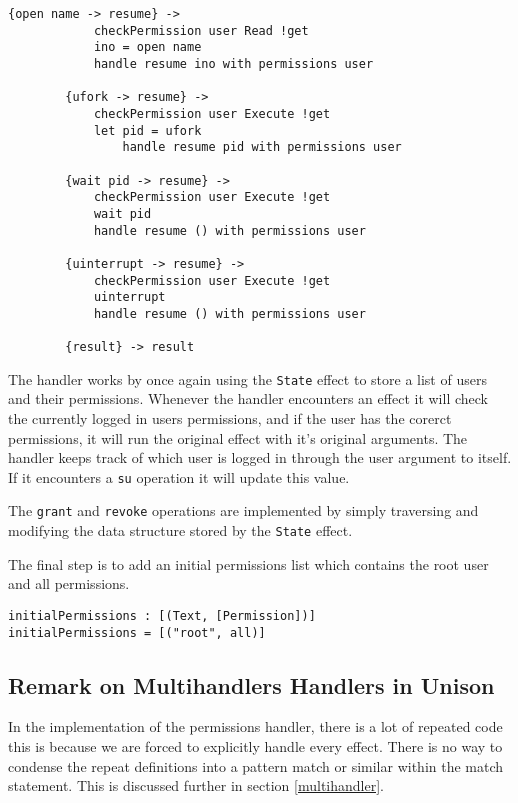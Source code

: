 \documentclass[logo,bsc,singlespacing,parskip]{infthesis}
\begin{document}
\begin{lstlisting}[language=unison]
        {open name -> resume} ->
            checkPermission user Read !get
            ino = open name
            handle resume ino with permissions user

        {ufork -> resume} ->
            checkPermission user Execute !get
            let pid = ufork
                handle resume pid with permissions user

        {wait pid -> resume} ->
            checkPermission user Execute !get
            wait pid
            handle resume () with permissions user

        {uinterrupt -> resume} ->
            checkPermission user Execute !get
            uinterrupt
            handle resume () with permissions user

        {result} -> result
\end{lstlisting}

The handler works by once again using the \texttt{State} effect to store a list
of users and their permissions. Whenever the handler encounters an effect it
will check the currently logged in users permissions, and if the user has the
corerct permissions, it will run the original effect with it's original
arguments. The handler keeps track of which user is logged in through the user
argument to itself. If it encounters a \texttt{su} operation it will update
this value.

The \texttt{grant} and \texttt{revoke} operations are implemented by simply 
traversing and modifying the data structure stored by the \texttt{State} effect.

The final step is to add an initial permissions list which contains the root
user and all permissions.

\begin{lstlisting}[language=unison]
initialPermissions : [(Text, [Permission])]
initialPermissions = [("root", all)]
\end{lstlisting}

\subsection{Remark on Multihandlers Handlers in Unison}

In the implementation of the permissions handler, there is a lot of repeated
code this is because we are forced to explicitly handle every effect. There is
no way to condense the repeat definitions into a pattern match or similar
within the match statement. This is discussed further in section
\ref{multihandler}. 
\end{document}
